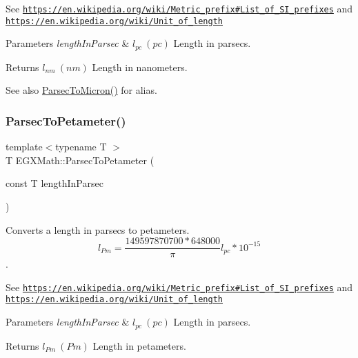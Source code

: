 See \href{https://en.wikipedia.org/wiki/Metric_prefix#List_of_SI_prefixes}{\tt https\+://en.\+wikipedia.\+org/wiki/\+Metric\+\_\+prefix\#\+List\+\_\+of\+\_\+\+S\+I\+\_\+prefixes} and \href{https://en.wikipedia.org/wiki/Unit_of_length}{\tt https\+://en.\+wikipedia.\+org/wiki/\+Unit\+\_\+of\+\_\+length} 
\begin{DoxyParams}{Parameters}
{\em length\+In\+Parsec} & $ l_{pc}\ (pc)$ Length in parsecs. \\
\hline
\end{DoxyParams}
\begin{DoxyReturn}{Returns}
$ l_{nm}\ (nm)$ Length in nanometers. 
\end{DoxyReturn}
\begin{DoxySeeAlso}{See also}
\mbox{\hyperlink{group___e_g_x_math-_conversions-_length_conversions-_astronomical-_parsec-_non-_s_i_ga9460305baf1a39635da24198d888a91b}{Parsec\+To\+Micron()}} for alias. 
\end{DoxySeeAlso}
\mbox{\label{group___e_g_x_math-_conversions-_length_conversions-_astronomical-_parsec-_s_i_ga9902983ed9563d247c8701370a95eb55}} 
\subsubsection{\texorpdfstring{Parsec\+To\+Petameter()}{ParsecToPetameter()}}
{\footnotesize\ttfamily template$<$typename T $>$ \\
T E\+G\+X\+Math\+::\+Parsec\+To\+Petameter (\begin{DoxyParamCaption}\item[{const T}]{length\+In\+Parsec }\end{DoxyParamCaption})}



Converts a length in parsecs to petameters. \[ l_{Pm}=\frac{149597870700 * 648000}{\pi}l_{pc} * 10^{-15} \]. 

See \href{https://en.wikipedia.org/wiki/Metric_prefix#List_of_SI_prefixes}{\tt https\+://en.\+wikipedia.\+org/wiki/\+Metric\+\_\+prefix\#\+List\+\_\+of\+\_\+\+S\+I\+\_\+prefixes} and \href{https://en.wikipedia.org/wiki/Unit_of_length}{\tt https\+://en.\+wikipedia.\+org/wiki/\+Unit\+\_\+of\+\_\+length} 
\begin{DoxyParams}{Parameters}
{\em length\+In\+Parsec} & $ l_{pc}\ (pc)$ Length in parsecs. \\
\hline
\end{DoxyParams}
\begin{DoxyReturn}{Returns}
$ l_{Pm}\ (Pm)$ Length in petameters. 
\end{DoxyReturn}
\mbox{\label{group___e_g_x_math-_conversions-_length_conversions-_astronomical-_parsec-_s_i_ga2d56b414320940d42a8956239e54c8b0}} 
